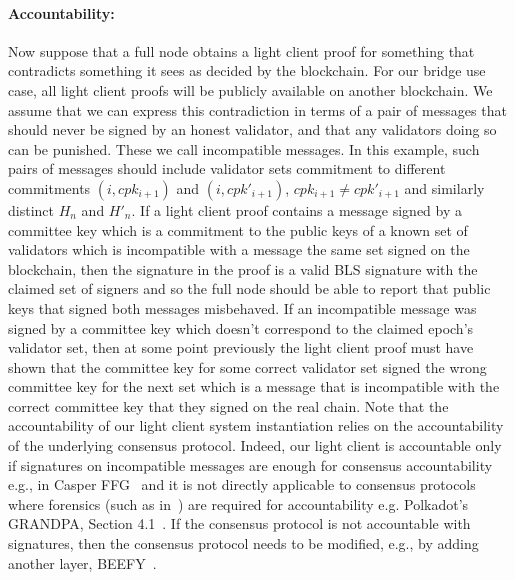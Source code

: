 \noindent\paragraph{Accountability:} Now suppose that a full node obtains a light client proof for something that contradicts something it sees as decided by the blockchain. For our bridge use case, 
all light client proofs will be publicly available on another blockchain. We assume that we can express this contradiction in terms of a pair of messages that should never be signed by an honest 
validator, and that any validators doing so can be punished. These we call incompatible messages. In this example, such pairs of messages should include validator sets commitment to different 
commitments $(i,cpk_{i+1})$ and $(i,cpk'_{i+1})$, $cpk_{i+1} \neq cpk'_{i+1}$ and similarly distinct $H_n$ and $H'_n$. If a light client proof contains a message signed by a committee key which 
is a commitment to the public keys of a known set of validators which is incompatible with a message the same set signed on the blockchain, then the signature in the proof is a valid BLS signature 
with the claimed set of signers and so the full node should be able to report that public keys that signed both messages misbehaved. If an incompatible message was signed by a committee key 
which doesn't correspond to the claimed epoch's validator set, then at some point previously the light client proof must have shown that the committee key for some correct validator set signed 
the wrong committee key for the next set which is a message that is incompatible with the correct committee key that they signed on the real chain. {\color{red}Note that the accountability of 
our light client system instantiation relies on the accountability of the underlying consensus protocol. Indeed, our light client is accountable only if signatures on incompatible messages 
are enough for consensus accountability e.g., in Casper FFG~\cite{CasperFFG} and it is not directly applicable to consensus protocols where forensics (such as in~\cite{forensics}) are required for accountability e.g. 
Polkadot's GRANDPA, Section 4.1~\cite{GRANDPA}. If the consensus protocol is not accountable with signatures, then the consensus protocol needs to 
be modified, e.g., by adding another layer, BEEFY~\cite{BEEFY}.}
\vspace{-0.05in}


